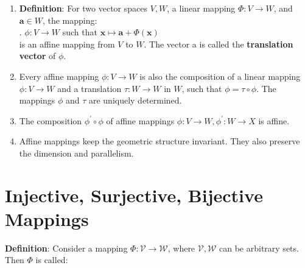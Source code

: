 \begin{enumerate}
    \item \textbf{Definition}: For two vector spaces $V, W$, a linear mapping $\Phi : V \to W$, and $\bm{a} \in W$, the mapping:
    \hfill \cite{mfml/book/mml/Deisenroth-Faisal-Ong}
    \\
    .\hfill
    $ \phi : V \to W $ such that $ \bm{x} \mapsto \bm{a} + \Phi(\bm{x}) $
    \hfill \cite{mfml/book/mml/Deisenroth-Faisal-Ong}
    \\
    is an affine mapping from $V$ to $W$. 
    The vector a is called the \textbf{translation vector} of $\phi$.
    \hfill \cite{mfml/book/mml/Deisenroth-Faisal-Ong}

    \item Every affine mapping $\phi  : V \to W$ is also the composition of a linear mapping $\phi  : V \to W$ and a translation $\tau : W \to W$ in $W$, such that $\phi  = \tau \circ \phi $. 
    The mappings $\phi $ and $\tau$ are uniquely determined.
    \hfill \cite{mfml/book/mml/Deisenroth-Faisal-Ong}

    \item The composition $\phi ^\prime \circ \phi $ of affine mappings $\phi  : V \to W, \phi ^\prime: W \to X$ is affine.
    \hfill \cite{mfml/book/mml/Deisenroth-Faisal-Ong}

    \item Affine mappings keep the geometric structure invariant. 
    They also preserve the dimension and parallelism.
    \hfill \cite{mfml/book/mml/Deisenroth-Faisal-Ong}
\end{enumerate}



























\section{Injective, Surjective, Bijective Mappings}

\textbf{Definition}: Consider a mapping $\Phi : \mathcal{V} \to \mathcal{W}$, where $\mathcal{V}, \mathcal{W}$ can be arbitrary sets. 
Then $\Phi$ is called:
\hfill \cite{mfml/book/mml/Deisenroth-Faisal-Ong}

